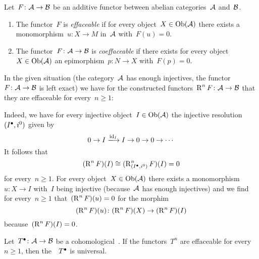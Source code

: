 \begin{definition}
  Let~$F \colon \mathcal{A} \to \mathcal{B}$ be an additive functor between abelian categories~$\mathcal{A}$ and~$\mathcal{B}$.
  \begin{enumerate}
    \item
      The functor~$F$ is \emph{effaceable} if for every object~$X \in \operatorname{Ob}(\mathcal{A})$ there exists a monomorphism~$u \colon X \to M$ in~$\mathcal{A}$ with~$F(u) = 0$.
    \item
      The functor~$F \colon \mathcal{A} \to \mathcal{B}$ is \emph{coeffaceable} if there exists for every object~$X \in \operatorname{Ob}(\mathcal{A})$ an epimorphism~$p \colon N \to X$ with~$F(p) = 0$.
  \end{enumerate}
\end{definition}


\begin{remark}
  \label{construction is effaceable}
  In the given situation (the category~$\mathcal{A}$ has enough injectives, the functor~$F \colon \mathcal{A} \to \mathcal{B}$ is left exact) we have for the constructed functors~$\operatorname{R}^n F \colon \mathcal{A} \to \mathcal{B}$ that they are effaceable for every~$n \geq 1$:
  
  Indeed, we have for every injective object~$I \in \operatorname{Ob}(\mathcal{A})$ the injective resolution~$(I^\bullet, i^0)$ given by
  \[
    0
    \to
    I
    \xlongto{\id_I}
    I
    \to
    0
    \to
    0
    \to
    \dotsb
  \]
  It follows that
  \[
    (\operatorname{R}^n F)(I)
    \cong
    (\operatorname{R}^n_{(I^\bullet, i^0)} F)(I)
    =
    0
  \]
  for every~$n \geq 1$.
  For every object~$X \in \operatorname{Ob}(\mathcal{A})$ there exists a monomorphism~$u \colon X \to I$ with~$I$ being injective (because~$\mathcal{A}$ has enough injectives) and we find for every~$n \geq 1$ that~$(\operatorname{R}^n F)(u) = 0$ for the morphim
  \[
    (\operatorname{R}^n F)(u)
    \colon
    (\operatorname{R}^n F)(X)
    \to
    (\operatorname{R}^n F)(I)
  \]
  because~$(\operatorname{R}^n F)(I) = 0$.
\end{remark}


\begin{theorem}
  \label{effaceable is universal}
  Let~$T^\bullet \colon \mathcal{A} \to \mathcal{B}$ be a cohomological~{\deltafun}.
  If the functors~$T^n$ are effaceable for every~$n \geq 1$, then the~{\deltafun}~$T^\bullet$ is universal.
\end{theorem}


